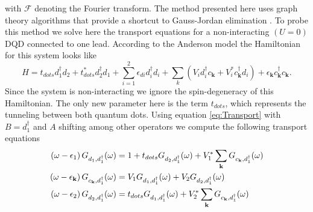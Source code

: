 \documentclass[showpacs,aps,prb,reprint,superscriptaddress]{revtex4-1}
\begin{document}
\noindent with $\mathcal{F}$ denoting the Fourier transform. 
The method presented here uses graph theory algorithms that provide a shortcut to Gauss-Jordan elimination \cite{spielman10}. To probe this method we solve here the transport equations for a non-interacting $(U=0)$ DQD connected to one lead. According to the Anderson model the Hamiltonian for this system looks like 
\begin{equation}
    H=t_{dots}d_{1}^{\dagger}d_{2}+t_{dots}^*d_{2}^{\dagger}d_{1}+ \sum_{i=1}^2\epsilon_{di}d_{i}^{\dagger}d_{i}+\sum_{k}\left(V_{i}d_{i}^{\dagger}c_{\mathbf{k}}+V_{i}^{*}c_{\mathbf{k}}^{\dagger}d_{i}\right) + \epsilon_{\mathbf{k}}c_{\mathbf{k}}^{\dagger}c_{\mathbf{k}}.
    \label{HDQD}
\end{equation} 
Since the system is non-interacting we ignore the spin-degeneracy of this Hamiltonian. The only new parameter here is the term $t_{dots}$, which represents the tunneling between both quantum dots.  Using equation \eqref{eq:Transport} with $B = d_1^\dagger$ and $A$ shifting among other operators we compute the following  transport equations
\begin{align}
     \left(\omega-\epsilon_{1}\right)G_{d_{1},d_{1}^{\dagger}}(\omega)&=1+t_{dots}G_{d_{2},d_{1}^{\dagger}}(\omega)+V_{1}^{*}\sum_{\mathbf{k}}G_{c_{\mathbf{k}},d_{1}^{\dagger}}(\omega) \label{eq:green1}  \\
     \left(\omega-\epsilon_{\mathbf{k}}\right)G_{c_{\mathbf{k}},d_{1}^{\dagger}}(\omega) &= V_{1}G_{d_{1},d_{1}^{\dagger}}(\omega)+V_{2}G_{d_{2},d_{1}^{\dagger}}(\omega) \label{eq:green2} \\
     \left(\omega-\epsilon_{2}\right)G_{d_{2},d_{1}^{\dagger}}(\omega)&= t_{dots}G_{d_{1},d_{1}^{\dagger}}(\omega)+V_{2}^{*}\sum_{\mathbf{k}}G_{c_{\mathbf{k}},d_{1}^{\dagger}}(\omega) \label{eq:green3} 
\end{align}

\end{document}

